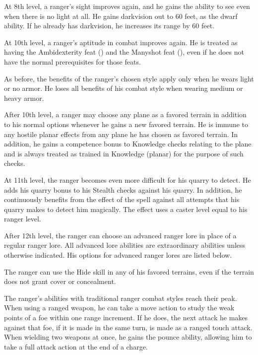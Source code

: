  At 8th level, a ranger's sight improves again, and he gains the ability to see even when there is no light at all. He gains darkvision out to 60 feet, as the dwarf ability. If he already has darkvision, he increases its range by 60 feet.

 At 10th level, a ranger's aptitude in combat improves again. He is treated as having the Ambidexterity feat () and the Manyshot feat (), even if he does not have the normal prerequisites for those feats.
\par As before, the benefits of the ranger's chosen style apply only when he wears light or no armor. He loses all benefits of his combat style when wearing medium or heavy armor.

 After 10th level, a ranger may choose any plane as a favored terrain in addition to his normal options whenever he gains a new favored terrain. He is immune to any hostile planar effects from any plane he has chosen as favored terrain. In addition, he gains a  competence bonus to Knowledge checks relating to the plane and is always treated as trained in Knowledge (planar) for the purpose of such checks.

 At 11th level, the ranger becomes even more difficult for his quarry to detect. He adds his quarry bonus to his Stealth checks against his quarry. In addition, he continuously benefits from the effect of the  spell against all attempts that his quarry makes to detect him magically. The effect uses a caster level equal to his ranger level.

 After 12th level, the ranger can choose an advanced ranger lore in place of a regular ranger lore. All advanced lore abilities are extraordinary abilities unless otherwise indicated. His options for advanced ranger lores are listed below.

 The ranger can use the Hide skill in any of his favored terrains, even if the terrain does not grant cover or concealment.

 The ranger's abilities with traditional ranger combat styles reach their peak. When using a ranged weapon, he can take a move action to study the weak points of a foe within one range increment. If he does, the next attack he makes against that foe, if it is made in the same turn, is made as a ranged touch attack. When wielding two weapons at once, he gains the pounce ability, allowing him to take a full attack action at the end of a charge.

